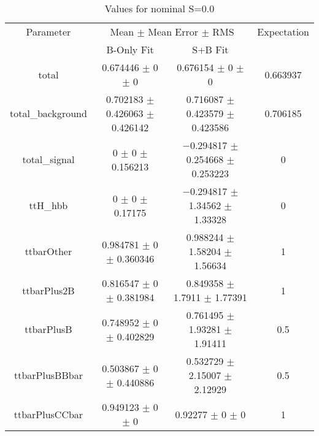 \begin{table}
\centering
\caption{Values for nominal S=0.0}
\begin{tabular}{cccc}
\toprule
Parameter & \multicolumn{2}{c}{Mean $\pm$ Mean Error $\pm$ RMS} & Expectation\\
 & B-Only Fit & S+B Fit & \\
\midrule
total & \num{0.674446} $\pm$ \num{0} $\pm$ \num{0} & \num{0.676154} $\pm$ \num{0} $\pm$ \num{0} & \num{0.663937}\\
total\_background & \num{0.702183} $\pm$ \num{0.426063} $\pm$ \num{0.426142} & \num{0.716087} $\pm$ \num{0.423579} $\pm$ \num{0.423586} & \num{0.706185}\\
total\_signal & \num{0} $\pm$ \num{0} $\pm$ \num{0.156213} & \num{-0.294817} $\pm$ \num{0.254668} $\pm$ \num{0.253223} & \num{0}\\
ttH\_hbb & \num{0} $\pm$ \num{0} $\pm$ \num{0.17175} & \num{-0.294817} $\pm$ \num{1.34562} $\pm$ \num{1.33328} & \num{0}\\
ttbarOther & \num{0.984781} $\pm$ \num{0} $\pm$ \num{0.360346} & \num{0.988244} $\pm$ \num{1.58204} $\pm$ \num{1.56634} & \num{1}\\
ttbarPlus2B & \num{0.816547} $\pm$ \num{0} $\pm$ \num{0.381984} & \num{0.849358} $\pm$ \num{1.7911} $\pm$ \num{1.77391} & \num{1}\\
ttbarPlusB & \num{0.748952} $\pm$ \num{0} $\pm$ \num{0.402829} & \num{0.761495} $\pm$ \num{1.93281} $\pm$ \num{1.91411} & \num{0.5}\\
ttbarPlusBBbar & \num{0.503867} $\pm$ \num{0} $\pm$ \num{0.440886} & \num{0.532729} $\pm$ \num{2.15007} $\pm$ \num{2.12929} & \num{0.5}\\
ttbarPlusCCbar & \num{0.949123} $\pm$ \num{0} $\pm$ \num{0} & \num{0.92277} $\pm$ \num{0} $\pm$ \num{0} & \num{1}\\
\bottomrule
\end{tabular}
\end{table}